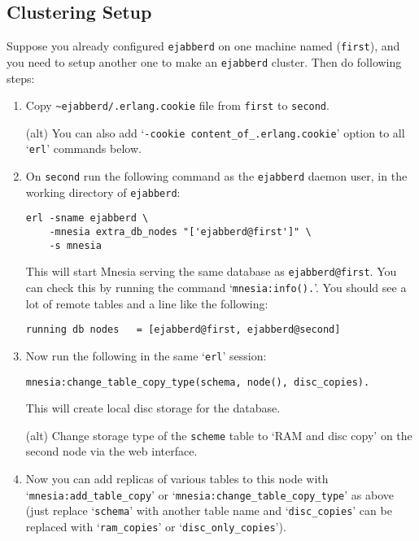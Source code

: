 \documentclass[a4paper,10pt]{article}
\newcommand{\ind}[1]{\begin{latexonly}\index{#1}\end{latexonly}}
\newcommand{\node}[1]{\texttt{#1}}
\newcommand{\term}[1]{\texttt{#1}}
\newcommand{\shell}[1]{\texttt{#1}}
\newcommand{\ejabberd}{\texttt{ejabberd}}
\begin{document}
\subsection{Clustering Setup}
\label{cluster}
\ind{clustering!setup}

Suppose you already configured \ejabberd{} on one machine named (\term{first}),
and you need to setup another one to make an \ejabberd{} cluster. Then do
following steps:

\begin{enumerate}
\item Copy \verb|~ejabberd/.erlang.cookie| file from \term{first} to
  \term{second}.

  (alt) You can also add `\verb|-cookie content_of_.erlang.cookie|'
  option to all `\shell{erl}' commands below.

\item On \term{second} run the following command as the \ejabberd{} daemon user,
  in the working directory of \ejabberd{}:

\begin{verbatim}
erl -sname ejabberd \
    -mnesia extra_db_nodes "['ejabberd@first']" \
    -s mnesia
\end{verbatim}

  This will start Mnesia serving the same database as \node{ejabberd@first}.
  You can check this by running the command `\verb|mnesia:info().|'. You
  should see a lot of remote tables and a line like the following:

\begin{verbatim}
running db nodes   = [ejabberd@first, ejabberd@second]
\end{verbatim}


\item Now run the following in the same `\shell{erl}' session:

\begin{verbatim}
mnesia:change_table_copy_type(schema, node(), disc_copies).
\end{verbatim}

  This will create local disc storage for the database.

  (alt) Change storage type of the \term{scheme} table to `RAM and disc
  copy' on the second node via the web interface.


\item Now you can add replicas of various tables to this node with
  `\verb|mnesia:add_table_copy|' or
  `\verb|mnesia:change_table_copy_type|' as above (just replace
  `\verb|schema|' with another table name and `\verb|disc_copies|'
  can be replaced with `\verb|ram_copies|' or
  `\verb|disc_only_copies|').


\end{enumerate}
\end{document}
